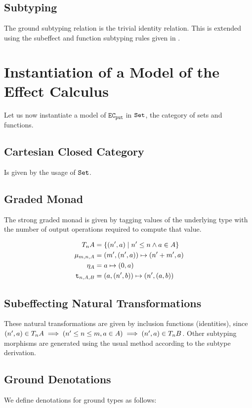 \documentclass{Report}
\renewcommand\put[0]{\texttt{put}}
\newcommand\ecput[0]{\texttt{EC}_\put}
\newcommand{\setcomp}[2]{\{#1 \mid #2 \}}
\begin{document}
    \subsection{Subtyping}
    The ground subtyping relation is the trivial identity relation. This is extended using the subeffect and function subtyping rules given in .


    \section{Instantiation of a Model of the Effect Calculus}

    Let us now instantiate a model of $\ecput$ in $\texttt{Set}$, the category of sets and functions.

    \subsection{Cartesian Closed Category}
    Is given by the usage of $\texttt{Set}$.
    
    \subsection{Graded Monad}
    The strong graded monad is given by tagging values of the underlying type with the number of output operations required to compute that value.

    \begin{align}
        \label{AdequacyGradedMonad}
        \T{n}{A} & = \setcomp{(n', a)}{n'\leq n\wedge a\in A}\\
        \bind{m}{n}{A} & = (m', (n', a))\mapsto (n' + m', a)\\
        \point{A} & = a\mapsto (0, a)\\\
        \tstrength{n}{A}{B} & = (a, (n', b)) \mapsto (n', (a, b))
    \end{align}


\subsection{Subeffecting Natural Transformations}
These natural transformations are given by inclusion functions (identities), since $(n',a)\in T_{n}{A} \implies (n'\leq n \leq m, a\in A)\implies (n',a)\in T_{n}{B}$. Other subtyping morphisms are generated using the usual method according to the subtype derivation.

\subsection{Ground Denotations}
We define denotations for ground types as follows:
\end{document}
